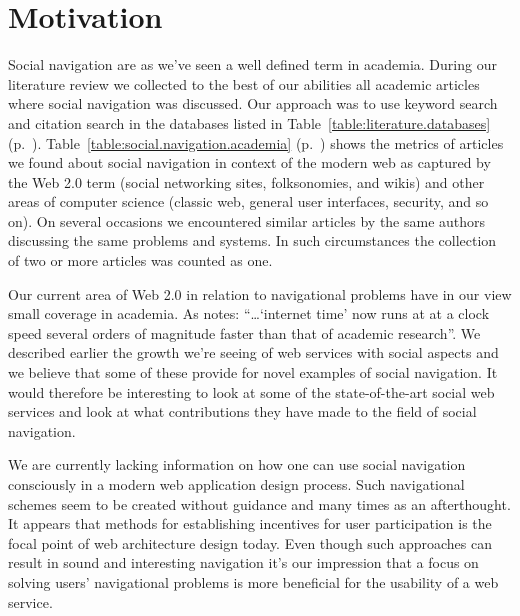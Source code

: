 \section{Motivation}

Social navigation are as we've seen a well defined term in academia. During
our literature review we collected to the best of our abilities all academic
articles where social navigation was discussed. Our approach was to use
keyword search and citation search in the databases listed in
Table~\ref{table:literature.databases}
(p.~\pageref{table:literature.databases}).
Table~\ref{table:social.navigation.academia}
(p.~\pageref{table:social.navigation.academia}) shows the metrics of articles
we found about social navigation in context of the modern web as captured by
the Web 2.0 term (social networking sites, folksonomies, and wikis) and other
areas of computer science (classic web, general user interfaces, security, and
so on).
On several occasions we encountered similar articles by the same authors
discussing the same problems and systems. In such circumstances the collection
of two or more articles was counted as one.

Our current area of Web 2.0 in relation to navigational problems have in our
view small coverage in academia.
As \citet{beer07} notes: ``\ldots `internet time' now runs at at a clock speed
several orders of magnitude faster than that of academic research''.
We described earlier the growth we're seeing of web services with social
aspects and we believe that some of these provide for novel examples of social
navigation. It would therefore be interesting to look at some of the
state-of-the-art social web services and look at what contributions they have
made to the field of social navigation.


We are currently lacking information on how one can use social navigation
consciously in a modern web application design process. Such navigational
schemes seem to be created without guidance and many times as an afterthought.
It appears that methods for establishing incentives for user participation
is the focal point of web architecture design today. Even though such
approaches can result in sound and interesting navigation it's our impression
that a focus on solving users' navigational problems is more beneficial for
the usability of a web service.

